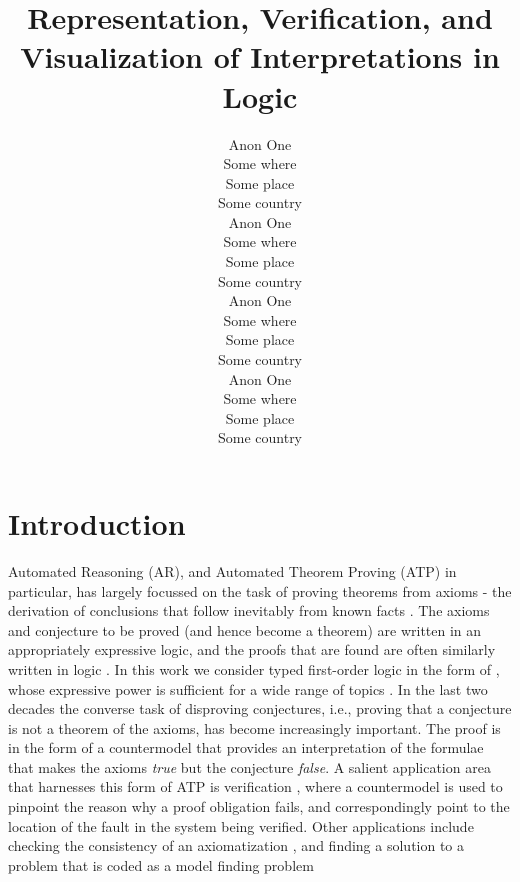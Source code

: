 \documentclass[letterpaper]{article}
\begin{document}

\title{Representation, Verification, and Visualization of Interpretations in Logic}
\author{Anon One\\
Some where\\
Some place\\
Some country\\
\And
Anon One\\
Some where\\
Some place\\
Some country\\
\And
Anon One\\
Some where\\
Some place\\
Some country\\
\And
Anon One\\
Some where\\
Some place\\
Some country}

\maketitle
\begin{abstract}
\begin{quote}
\end{quote}
\end{abstract}
\section{Introduction}
\label{Introduction}

Automated Reasoning (AR), and Automated Theorem Proving (ATP) in particular, has largely focussed
on the task of proving theorems from axioms - the derivation of conclusions that follow inevitably 
from known facts \cite{RV01-HAR}.
The axioms and conjecture to be proved (and hence become a theorem) are written in an 
appropriately expressive logic, and the proofs that are found are often similarly written in
logic \cite{SS+06}.
In this work we consider typed first-order logic in the form of \cite{Wal83,Sch85,Coh87},
whose expressive power is sufficient for a wide range of topics \cite{Sut17}.
In the last two decades the converse task of disproving conjectures, i.e., proving that a 
conjecture is not a theorem of the axioms, has become increasingly important.
The proof is in the form of a countermodel that provides an interpretation of the formulae that 
makes the axioms {\em true} but the conjecture {\em false}.
A salient application area that harnesses this form of ATP is verification \cite{DKW08},
where a countermodel is used to pinpoint the reason why a proof obligation fails, and
correspondingly point to the location of the fault in the system being verified.
Other applications include checking the consistency of an axiomatization \cite{SS+17}, and
finding a solution to a problem that is coded as a model finding problem \cite{Win82}
\end{document}
